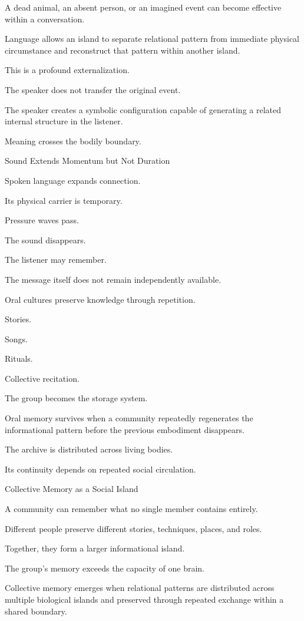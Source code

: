 A dead animal, an absent person, or an imagined event can become effective within a conversation.

Language allows an island to separate relational pattern from immediate physical circumstance and reconstruct that pattern within another island.

This is a profound externalization.

The speaker does not transfer the original event.

The speaker creates a symbolic configuration capable of generating a related internal structure in the listener.

Meaning crosses the bodily boundary.

Sound Extends Momentum but Not Duration

Spoken language expands connection.

Its physical carrier is temporary.

Pressure waves pass.

The sound disappears.

The listener may remember.

The message itself does not remain independently available.

Oral cultures preserve knowledge through repetition.

Stories.

Songs.

Rituals.

Collective recitation.

The group becomes the storage system.

Oral memory survives when a community repeatedly regenerates the informational pattern before the previous embodiment disappears.

The archive is distributed across living bodies.

Its continuity depends on repeated social circulation.

Collective Memory as a Social Island

A community can remember what no single member contains entirely.

Different people preserve different stories, techniques, places, and roles.

Together, they form a larger informational island.

The group’s memory exceeds the capacity of one brain.

Collective memory emerges when relational patterns are distributed across multiple biological islands and preserved through repeated exchange within a shared boundary.

